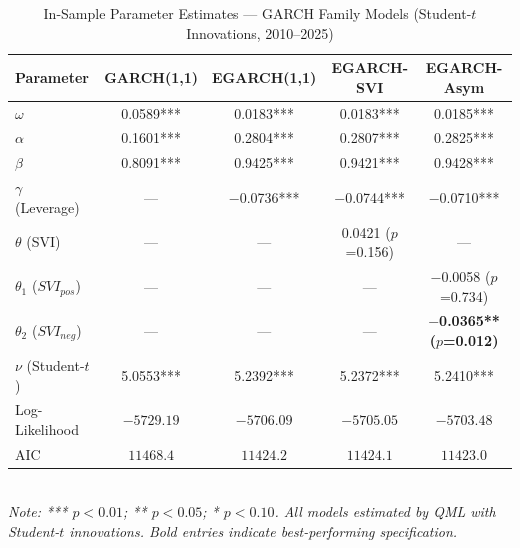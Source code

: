 \begin{table}[H]
\centering
\caption{In-Sample Parameter Estimates --- GARCH Family Models (Student-$t$ Innovations, 2010--2025)}
\label{tab:insample}
\small
\begin{tabular}{lcccc}
\toprule
Parameter & GARCH(1,1) & EGARCH(1,1) & EGARCH-SVI & EGARCH-Asym \\
\midrule
$\omega$               & 0.0589*** & 0.0183*** & 0.0183*** & 0.0185*** \\
$\alpha$               & 0.1601*** & 0.2804*** & 0.2807*** & 0.2825*** \\
$\beta$                & 0.8091*** & 0.9425*** & 0.9421*** & 0.9428*** \\
$\gamma$ (Leverage)    & --- & $-$0.0736*** & $-$0.0744*** & $-$0.0710*** \\
$\theta$ (SVI)         & --- & --- & 0.0421 ($p$=0.156) & --- \\
$\theta_1$ ($SVI_{pos}$) & --- & --- & --- & $-$0.0058 ($p$=0.734) \\
$\theta_2$ ($SVI_{neg}$) & --- & --- & --- & \textbf{$-$0.0365** ($p$=0.012)} \\
$\nu$ (Student-$t$)    & 5.0553*** & 5.2392*** & 5.2372*** & 5.2410*** \\
\midrule
Log-Likelihood & $-5729.19$ & $-5706.09$ & $-5705.05$ & $\mathbf{-5703.48}$ \\
AIC            & $11468.4$ & $11424.2$ & $11424.1$ & $\mathbf{11423.0}$ \\
\bottomrule
\end{tabular}
\smallskip\\
\footnotesize\textit{Note: *** $p<0.01$; ** $p<0.05$; * $p<0.10$. All models estimated by QML with Student-$t$ innovations. Bold entries indicate best-performing specification.}
\end{table}